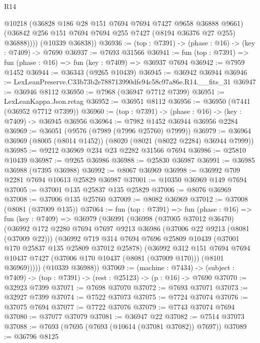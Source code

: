 \begin{lexlean}{R14}
\begin{coremodule}
            @10218
            (@36828 @186 @28 @151 @7694 @7694 @7427 @9658 @36888 @9661)
            (@36842 @256 @151 @7694 @7694 @255 @7427 (@8194 @36376 @27 @255) @36888))))
      (@10339 @36838))
@36936 := (top : @7391) -> (phase : @16) -> (key : @7409) -> @7690
@36937 := @7693 @31566
@36941 := fun (top : @7391) => fun (phase : @16) => fun (key : @7409) => @36937 @7694
@36942 := @7959 @1452
@36944 := @36343 (@9265 @10439)
@36945 := @36942 @36944
@36946 := LexLeanPreserve.C33b73b2e788713990dfe94c58c97a86e.R14.__fits_31
@36947 := @36946 @8112
@36950 := @7968 (@36947 @7712 @7399)
@36951 := LexLeanKappa.Json.retag
@36952 := @36951 @8112
@36956 := @36950 (@7441 (@36952 @7712 @7399))
@36960 := (top : @7391) -> (phase : @16) -> (key : @7409) -> @36945 @36956
@36964 := @7982 @1452 @36944 @36956 @2284
@36969 := @36051 (@9576 (@7989 (@7996 @25760) @7999))
@36979 := @36964 @36969 (@8005 (@8014 @1452)) (@8020 (@8021 (@8022 @2284) @36944 @7999))
@36985 := @9212 @36969 @234 @23 @2282 @31566 @7694
@36986 := @25810 @10439
@36987 := @9265 @36986
@36988 := @25830 @36987
@36991 := @36985 @36988 (@7395 @36988)
@36992 := @8067 @36969
@36998 := @36992 @709 @2281 @7694 @10613 @25829 @36987
@37001 := @10350 @36969 @149 @7694
@37005 := @37001 @135 @25837 @135 @25829
@37006 := @8076 @36969
@37008 := @37006 @135 @25760
@37009 := @8082 @36969
@37012 := @37008 (@8081 (@37009 @135))
@37064 := fun (top : @7391) =>
  fun (phase : @16) =>
  fun (key : @7409) =>
  @36979
    (@36991
      (@36998
        (@37005 @37012 @36470)
        (@36992
          @172
          @2280
          @7694
          @7697
          @9213
          @36986
          (@37006 @22 @9213 (@8081 (@37009 @22)))
          (@36992
            @719
            @314
            @7694
            @7696
            @25809
            @10439
            (@37001 @170 @25837 @135 @25809 @37012 @25878)
            (@36992
              @312
              @151
              @7694
              @7694
              @10437
              @7427
              (@37006 @170 @10437 (@8081 (@37009 @170)))
              (@8101 @36969)))))
      (@10339 @36988))
@37069 := (machine : @7434) ->
  (subject : @7409) -> (top : @7391) -> (rest : @25123) -> (p : @16) -> @7690
@37070 := @32923 @7399
@37071 := @7698 @37070
@37072 := @7693 @37071
@37073 := @32927 @7399
@37074 := @7522 @37073
@37075 := @7724 @37074
@37076 := @37075 @7694
@37077 := @7722 @37076
@37079 := @7743 @37074 @7694
@37080 := @37077 @37079
@37081 := @36947 @22
@37082 := @7514 @37073
@37088 := @7693 (@7695 (@7693 (@10614 (@37081 @37082)) @7697))
@37089 := @36796 @8125

\end{coremodule}
\end{lexlean}
